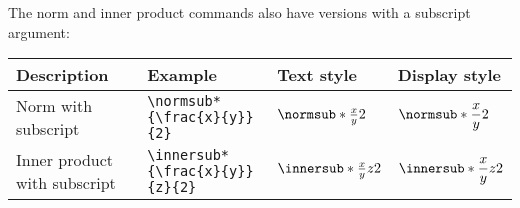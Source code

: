 \documentclass{article}
\begin{document}
The norm and inner product commands also have versions with a subscript argument:

\begin{center}
\begin{tabular}{@{}llll@{}}
\toprule
Description				& Example 					& Text style 				& Display style \\ \midrule
Norm	with subscript				& \verb!\normsub*{\frac{x}{y}}{2}!       	& $\normsub*{\frac{x}{y}}{2}$ 	& $\displaystyle\normsub*{\frac{x}{y}}{2}$ \\[10pt]
Inner product with subscript			& \verb!\innersub*{\frac{x}{y}}{z}{2}!       	& $\innersub*{\frac{x}{y}}{z}{2}$ 	& $\displaystyle\innersub*{\frac{x}{y}}{z}{2}$ \\[10pt]
\bottomrule
\end{tabular}
\end{center}
\end{document}
